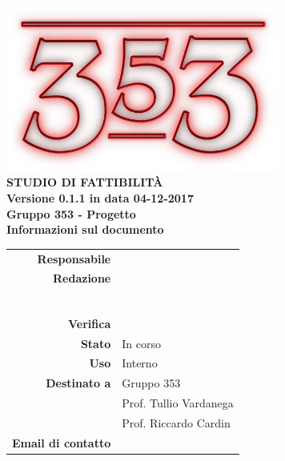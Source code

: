 \documentclass[openany, a4paper, 12pt]{report}
\begin{document}
\begin{titlepage}
	\centering
	\vfill
	{
		\bfseries
		\vskip2cm
		\includegraphics[width=9cm]{../../common/images/logo.png} \\
		\vfill
		\Huge{STUDIO DI FATTIBILITÀ}\\
		\vfill
		\Large Versione 0.1.1 in data 04-12-2017\\
		\large Gruppo 353 - Progetto \progetto \\
		\vfill
	\normalsize Informazioni sul documento\\
\begin{table}[htbp]
	\centering
	\renewcommand\arraystretch{1.2}
	\begin{tabular}{r|l}
		\hline
		\textbf{Responsabile}	& \\
		
		\textbf{Redazione} 		& \Davide\\
								& \Elena\\
								& \Gianluca\\
								& \Mirco\\
								& \Parwinder\\
								& \Riccardo\\
								& \Valentina\\
								
		\textbf{Verifica} 		& \\		
							
		\textbf{Stato} 			& In corso\\
		
		\textbf{Uso}			& Interno\\
		
		\textbf{Destinato a}   	& Gruppo 353\\
								& Prof. Tullio Vardanega\\
								& Prof. Riccardo Cardin\\
		
				\textbf{Email di contatto}	& \mailgroup
	\end{tabular}
\end{table}
		\vfill
	}    
\end{titlepage}

\tableofcontents
\newpage
{}









 
\end{document}
